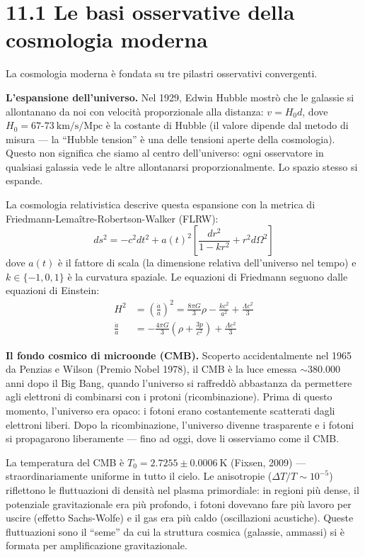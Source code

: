 \documentclass[11.5pt,a4paper,openany]{book}
\theoremstyle{remark}
\begin{document}
\section{11.1 Le basi osservative della cosmologia moderna}

La cosmologia moderna è fondata su tre pilastri osservativi convergenti.

\textbf{L'espansione dell'universo.} Nel 1929, Edwin Hubble mostrò che le galassie si allontanano da noi con velocità proporzionale alla distanza: $v = H_0 d$, dove $H_0 = 67$-$73\ \text{km/s/Mpc}$ è la costante di Hubble (il valore dipende dal metodo di misura --- la ``Hubble tension'' è una delle tensioni aperte della cosmologia). Questo non significa che siamo al centro dell'universo: ogni osservatore in qualsiasi galassia vede le altre allontanarsi proporzionalmente. Lo spazio stesso si espande.

La cosmologia relativistica descrive questa espansione con la metrica di Friedmann-Lemaître-Robertson-Walker (FLRW):
\[
ds^2 = -c^2 dt^2 + a(t)^2 \left[\frac{dr^2}{1-kr^2} + r^2 d\Omega^2\right]
\]
dove $a(t)$ è il fattore di scala (la dimensione relativa dell'universo nel tempo) e $k \in \{-1, 0, 1\}$ è la curvatura spaziale. Le equazioni di Friedmann seguono dalle equazioni di Einstein:
\begin{align}
H^2 &= \left(\frac{\dot{a}}{a}\right)^2 = \frac{8\pi G}{3}\rho - \frac{kc^2}{a^2} + \frac{\Lambda c^2}{3} \\
\frac{\ddot{a}}{a} &= -\frac{4\pi G}{3}\left(\rho + \frac{3p}{c^2}\right) + \frac{\Lambda c^2}{3}
\end{align}

\textbf{Il fondo cosmico di microonde (CMB).} Scoperto accidentalmente nel 1965 da Penzias e Wilson (Premio Nobel 1978), il CMB è la luce emessa $\sim 380.000$ anni dopo il Big Bang, quando l'universo si raffreddò abbastanza da permettere agli elettroni di combinarsi con i protoni (ricombinazione). Prima di questo momento, l'universo era opaco: i fotoni erano costantemente scatterati dagli elettroni liberi. Dopo la ricombinazione, l'universo divenne trasparente e i fotoni si propagarono liberamente --- fino ad oggi, dove li osserviamo come il CMB.

La temperatura del CMB è $T_0 = 2.7255 \pm 0.0006\ \text{K}$ (Fixsen, 2009) --- straordinariamente uniforme in tutto il cielo. Le anisotropie ($\Delta T/T \sim 10^{-5}$) riflettono le fluttuazioni di densità nel plasma primordiale: in regioni più dense, il potenziale gravitazionale era più profondo, i fotoni dovevano fare più lavoro per uscire (effetto Sachs-Wolfe) e il gas era più caldo (oscillazioni acustiche). Queste fluttuazioni sono il ``seme'' da cui la struttura cosmica (galassie, ammassi) si è formata per amplificazione gravitazionale.
\end{document}
